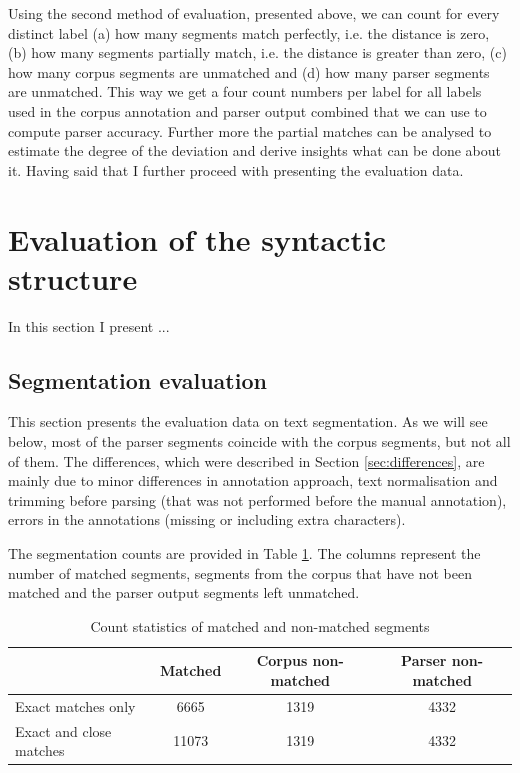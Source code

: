     Using the second method of evaluation, presented above, we can count for every distinct label (a) how many segments match perfectly, i.e. the distance is zero, (b) how many segments partially match, i.e. the distance is greater than zero, (c) how many corpus segments are unmatched and (d) how many parser segments are unmatched. This way we get a four count numbers per label for all labels used in the corpus annotation and parser output combined that we can use to compute parser accuracy. Further more the partial matches can be analysed to estimate the degree of the deviation and derive insights what can be done about it. Having said that I further proceed with presenting the evaluation data. 

\section{Evaluation of the syntactic structure}
\label{sec:syntactic-evaluation}
    In this section I present ...
    
\subsection{Segmentation evaluation}
\label{sec:segmentation-evaluation}
    
    This section presents the evaluation data on text segmentation. As we will see below, most of the parser segments coincide with the corpus segments, but not all of them. The differences, which were described in Section \ref{sec:differences}, are mainly due to minor differences in annotation approach, text normalisation and trimming before parsing (that was not performed before the manual annotation), errors in the annotations (missing or including extra characters). 
    
    The segmentation counts are provided in Table \ref{tab:segmentation-stats}. The columns represent  the number of matched segments, segments from the corpus that have not been matched and the parser output segments left unmatched.
    
    \begin{table}[!ht]
    \centering
    \begin{tabular}{lccc}
    \toprule
    {} &  Matched &  Corpus non-matched &  Parser non-matched \\
    \midrule
    Exact matches only &     6665 &                1319 &                4332 \\
    Exact and close matches &    11073 &                1319 &                4332 \\
    \bottomrule
    \end{tabular}
    \caption{Count statistics of matched and non-matched segments}
    \label{tab:segmentation-stats}
    \end{table}
    
